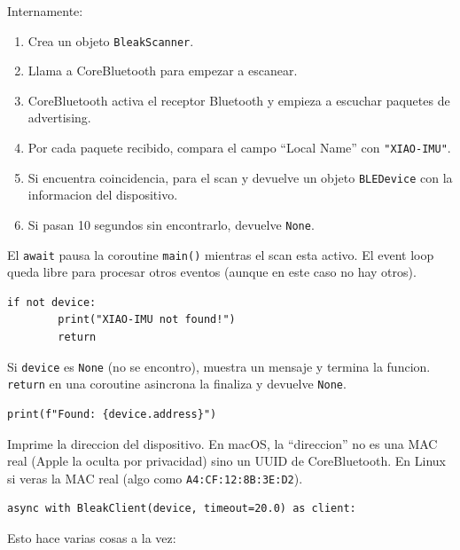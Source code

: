 \documentclass[11pt,a4paper]{article}
\begin{document}
Internamente:
\begin{enumerate}
    \item Crea un objeto \texttt{BleakScanner}.
    \item Llama a CoreBluetooth para empezar a escanear.
    \item CoreBluetooth activa el receptor Bluetooth y empieza a
          escuchar paquetes de advertising.
    \item Por cada paquete recibido, compara el campo
          ``Local Name'' con \texttt{"XIAO-IMU"}.
    \item Si encuentra coincidencia, para el scan y devuelve un
          objeto \texttt{BLEDevice} con la informacion del
          dispositivo.
    \item Si pasan 10 segundos sin encontrarlo, devuelve
          \texttt{None}.
\end{enumerate}

El \texttt{await} pausa la coroutine \texttt{main()} mientras el
scan esta activo. El event loop queda libre para procesar otros
eventos (aunque en este caso no hay otros).

\begin{lstlisting}[style=python]
    if not device:
        print("XIAO-IMU not found!")
        return
\end{lstlisting}

Si \texttt{device} es \texttt{None} (no se encontro), muestra un
mensaje y termina la funcion. \texttt{return} en una coroutine
asincrona la finaliza y devuelve \texttt{None}.

\begin{lstlisting}[style=python]
    print(f"Found: {device.address}")
\end{lstlisting}

Imprime la direccion del dispositivo. En macOS, la ``direccion''
no es una MAC real (Apple la oculta por privacidad) sino un UUID
de CoreBluetooth. En Linux si veras la MAC real (algo como
\texttt{A4:CF:12:8B:3E:D2}).

\begin{lstlisting}[style=python]
    async with BleakClient(device, timeout=20.0) as client:
\end{lstlisting}

Esto hace varias cosas a la vez:
\end{document}
